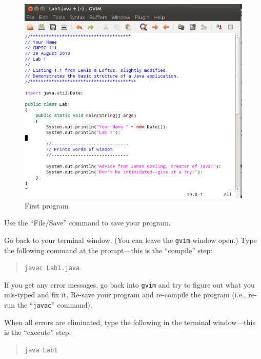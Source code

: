 \begin{figure}[htbp]
  \centering
  \includegraphics[width=5.8in]{images/lab1prog}
  \caption{First program}
  \label{lab1prog}
\end{figure}

       Use the ``File/Save'' command to save your program.

Go back to your terminal window. (You can leave the {\tt gvim} window open.) Type the following command at the
prompt---this is the ``compile'' step:

\begin{quote}
  \verb$javac Lab1.java$
\end{quote}

If you get any error messages, go back into {\tt gvim} and try to figure out what you mis-typed and fix it. Re-save your
program  and re-compile the program (i.e., re-run the ``{\tt javac}'' command).

When all errors are eliminated, type the following in the terminal window---this is the ``execute'' step:

\begin{quote}
  \verb$java Lab1$
\end{quote}

